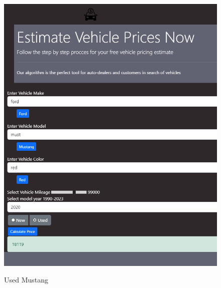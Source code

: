 \documentclass[12pt]{article}
\begin{document}
\begin{figure}[H]
\caption{Used Mustang}
\centering
\includegraphics[scale=.6]{figures/UsedMustang.png}\\
\end{figure}
\end{document}
